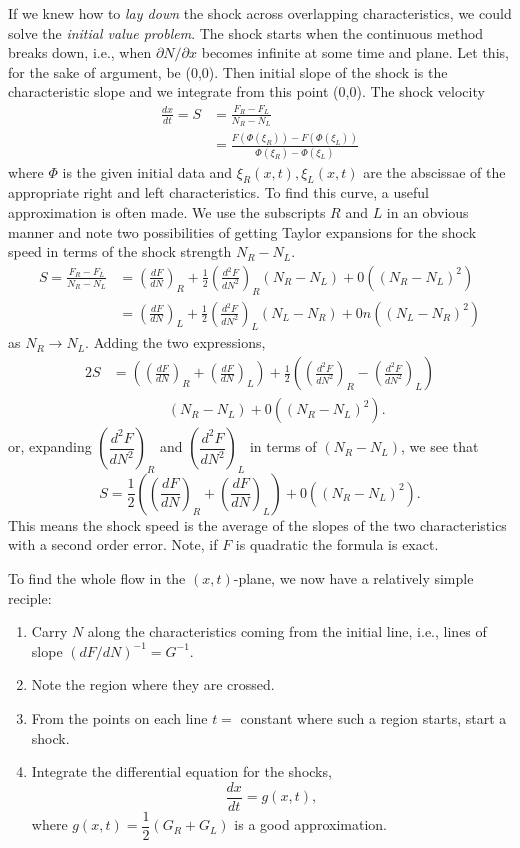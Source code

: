 If we knew how to {\em lay down} the shock across overlapping characteristics, we could solve the {\em initial value problem}. The shock starts when the continuous method breaks down, i.e., when $\partial N/ \partial x$ becomes infinite at some time and plane. Let this, for the sake of argument, be (0,0). Then initial slope of the shock is the characteristic slope and we integrate from this point (0,0). The shock velocity
\begin{align*}
\frac{dx}{dt} = S & = \frac{F_R - F_L}{N_R - N_L}\\
& = \frac{F(\Phi (\xi_R)) - F (\Phi (\xi_L))}{\Phi (\xi_R) - \Phi (\xi_L)}
\end{align*}
where $\Phi$ is the given initial data and $\xi_R (x,t), \xi_L(x,t)$ are the abscissae of the appropriate right and left characteristics. To find this curve, a useful approximation is often made. We use the subscripts $R$ and $L$ in an obvious manner and note two possibilities of getting Taylor expansions for the shock speed in terms of the shock strength $N_R - N_L$.
\begin{align*}
S = \frac{F_R - F_L}{N_R - N_L} & = (\frac{dF}{dN})_R + \frac{1}{2} (\frac{d^2 F}{dN^2})_R (N_R - N_L) + 0 ((N_R - N_L)^2)\\
& = (\frac{dF}{dN})_L + \frac{1}{2} (\frac{d^2 F}{dN^2})_L (N_L - N_R) + 0  n((N_L - N_R)^2)
\end{align*}\pageoriginale
as $N_R \to N_L$. Adding the two expressions,
\begin{align*}
2S &= \left(\left(\frac{dF}{dN} \right)_R + \left(\frac{dF}{dN}
\right)_L \right) + \frac{1}{2} \left( \left(\frac{d^2 F}{dN^2}
\right)_R - \left(\frac{d^2 F}{dN^2} \right)_L \right)\\
&\qquad\qquad (N_R - N_L) + 0
((N_R - N_L)^2).   
\end{align*}
or, expanding $\left(\dfrac{d^2 F}{dN^2} \right)_R$ and $\left(\dfrac{d^2 F}{dN^2} \right)_L$ in terms of $(N_R - N_L)$, we see that 
$$
S = \frac{1}{2} \left( \left(\frac{dF}{dN} \right)_R + \left(\frac{dF}{dN} \right)_L \right) +  0((N_R - N_L)^2). 
$$
This means the shock speed is the average of the slopes of the two characteristics with a second order error. Note, if $F$ is quadratic the formula is exact.

To find the whole flow in the $(x,t)$-plane, we now have a relatively simple reciple:
\begin{enumerate}
\item Carry $N$ along the characteristics coming from the initial line, i.e., lines of slope $(dF/ dN)^{-1} = G^{-1}$.

\item Note the region where they are crossed.

\item From the points on each line $t =$ constant where such a region starts, start a shock.

\item Integrate the differential equation for the shocks, 
$$
\frac{dx}{dt} = g (x,t),
$$
where $g(x,t) = \dfrac{1}{2} (G_R + G_L)$ is a good approximation.
\end{enumerate}

